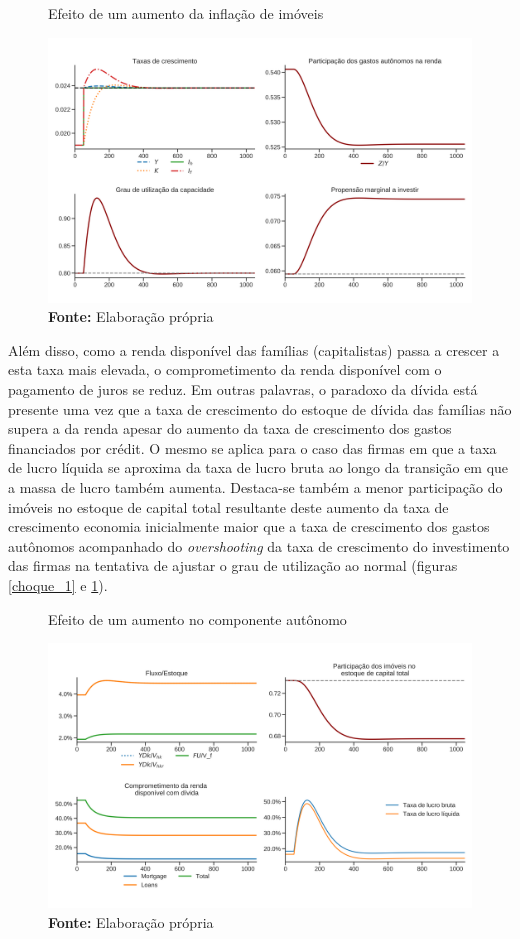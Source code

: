 \begin{figure}[H]
	\centering
	\caption{Efeito de um aumento da inflação de imóveis}
	\label{choque_4}
	\includegraphics[width=\textwidth]{../../Modelo/Versoes/Shock_4.png}
	\caption*{\textbf{Fonte:} Elaboração própria}
\end{figure}

Além disso, como a renda disponível das famílias (capitalistas) passa a crescer a esta taxa mais elevada, o comprometimento da renda disponível com o pagamento de juros se reduz. 
Em outras palavras, o paradoxo da dívida está presente 
uma vez que a taxa de crescimento do estoque de dívida das famílias não supera a da renda apesar do aumento da taxa de crescimento dos gastos financiados por crédit. O mesmo se aplica para o caso das firmas em que a taxa de lucro líquida se aproxima da taxa de lucro bruta ao longo da transição em que a massa de lucro também aumenta. 
Destaca-se também a menor participação do imóveis no estoque de capital total resultante deste aumento da taxa de crescimento economia inicialmente maior que a taxa de crescimento dos gastos autônomos acompanhado do \textit{overshooting} da taxa de crescimento do investimento das firmas na tentativa de ajustar o grau de utilização ao normal (figuras \ref{choque_1} e \ref{choque_4}).

\begin{figure}[H]
	\centering
	\caption{Efeito de um aumento no componente autônomo}
	\label{choque_1Norms}
	\includegraphics[width=\textwidth]{../../Modelo/Versoes/Shock_1Norms.png}
	\caption*{\textbf{Fonte:} Elaboração própria}
\end{figure}




